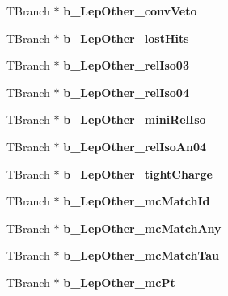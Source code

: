 \begin{DoxyCompactItemize}
\item 
\hypertarget{classMiniTree_aec9848167b0b202a7515abd944ea2ec9}{}\label{classMiniTree_aec9848167b0b202a7515abd944ea2ec9} 
T\+Branch $\ast$ {\bfseries b\+\_\+\+Lep\+Other\+\_\+conv\+Veto}
\item 
\hypertarget{classMiniTree_a05060f7095d9edd5ee289633fe35b65f}{}\label{classMiniTree_a05060f7095d9edd5ee289633fe35b65f} 
T\+Branch $\ast$ {\bfseries b\+\_\+\+Lep\+Other\+\_\+lost\+Hits}
\item 
\hypertarget{classMiniTree_acfd9f9f4b5eec067426e510bdbec9dab}{}\label{classMiniTree_acfd9f9f4b5eec067426e510bdbec9dab} 
T\+Branch $\ast$ {\bfseries b\+\_\+\+Lep\+Other\+\_\+rel\+Iso03}
\item 
\hypertarget{classMiniTree_ae835ea83aa8adfbde63503c0442b6834}{}\label{classMiniTree_ae835ea83aa8adfbde63503c0442b6834} 
T\+Branch $\ast$ {\bfseries b\+\_\+\+Lep\+Other\+\_\+rel\+Iso04}
\item 
\hypertarget{classMiniTree_aef6b925f50374257878fc48d4497c07a}{}\label{classMiniTree_aef6b925f50374257878fc48d4497c07a} 
T\+Branch $\ast$ {\bfseries b\+\_\+\+Lep\+Other\+\_\+mini\+Rel\+Iso}
\item 
\hypertarget{classMiniTree_ae3a5e3eea87473581bba958846961aaa}{}\label{classMiniTree_ae3a5e3eea87473581bba958846961aaa} 
T\+Branch $\ast$ {\bfseries b\+\_\+\+Lep\+Other\+\_\+rel\+Iso\+An04}
\item 
\hypertarget{classMiniTree_a2be1c77e5257d1bd2888147909047801}{}\label{classMiniTree_a2be1c77e5257d1bd2888147909047801} 
T\+Branch $\ast$ {\bfseries b\+\_\+\+Lep\+Other\+\_\+tight\+Charge}
\item 
\hypertarget{classMiniTree_ac3f43fc95f17b6bd178ae6c065417333}{}\label{classMiniTree_ac3f43fc95f17b6bd178ae6c065417333} 
T\+Branch $\ast$ {\bfseries b\+\_\+\+Lep\+Other\+\_\+mc\+Match\+Id}
\item 
\hypertarget{classMiniTree_a6859f5db0e934449459a1b46845e88c7}{}\label{classMiniTree_a6859f5db0e934449459a1b46845e88c7} 
T\+Branch $\ast$ {\bfseries b\+\_\+\+Lep\+Other\+\_\+mc\+Match\+Any}
\item 
\hypertarget{classMiniTree_aed6a1828746aa33da94d944fdfb494f4}{}\label{classMiniTree_aed6a1828746aa33da94d944fdfb494f4} 
T\+Branch $\ast$ {\bfseries b\+\_\+\+Lep\+Other\+\_\+mc\+Match\+Tau}
\item 
\hypertarget{classMiniTree_afd73d9683cd22c1e5edf9f9fd7185bae}{}\label{classMiniTree_afd73d9683cd22c1e5edf9f9fd7185bae} 
T\+Branch $\ast$ {\bfseries b\+\_\+\+Lep\+Other\+\_\+mc\+Pt}
\item 

\end{DoxyCompactItemize}
